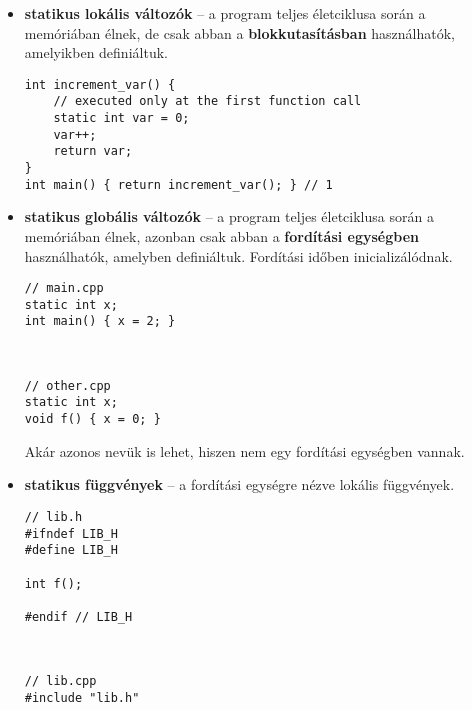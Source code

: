 \documentclass[a4paper, 11pt, oneside]{book}
\begin{document}
\begin{itemize}
\begin{itemize}
		\begin{itemize}
			\item \textbf{statikus lokális változók} -- a program teljes életciklusa során a memóriában élnek, de csak abban a \textbf{blokkutasításban} használhatók, amelyikben definiáltuk.
			\newpage
			\begin{lstlisting}[style=cppstyle]
int increment_var() {
	// executed only at the first function call
	static int var = 0;
	var++;
	return var;
}
int main() { return increment_var(); } // 1
			\end{lstlisting}
		
			\item \textbf{statikus globális változók} -- a program teljes életciklusa során a memóriában élnek, azonban csak abban a \textbf{fordítási egységben} használhatók, amelyben definiáltuk. Fordítási időben inicializálódnak.
			
			\begin{minipage}{0.4\linewidth}
	\begin{lstlisting}[style=cppstyle]
// main.cpp
static int x;
int main() { x = 2; }
	\end{lstlisting}
\end{minipage}
\begin{minipage}{0.1\linewidth}
	~
\end{minipage}
\begin{minipage}{0.45\linewidth}
	\begin{lstlisting}[style=cppstyle]
// other.cpp
static int x;
void f() { x = 0; }
	\end{lstlisting}
\end{minipage}

Akár azonos nevük is lehet, hiszen nem egy fordítási egységben vannak.			
			
			\item \textbf{statikus függvények} -- a fordítási egységre nézve lokális függvények.
			
			\begin{minipage}{0.4\linewidth}
				\begin{lstlisting}[style=cppstyle]
// lib.h
#ifndef LIB_H
#define LIB_H

int f();

#endif // LIB_H

				\end{lstlisting}
			\end{minipage}
			\begin{minipage}{0.1\linewidth}
				~
			\end{minipage}
			\begin{minipage}{0.45\linewidth}
\begin{lstlisting}[style=cppstyle]
// lib.cpp
#include "lib.h"


\end{lstlisting}
\end{minipage}
\end{itemize}
\end{itemize}
\end{itemize}
\end{document}

